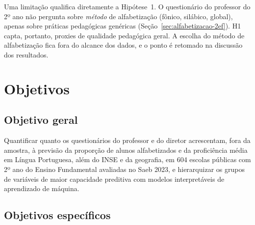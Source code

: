Uma limitação qualifica diretamente a Hipótese~1. O questionário do
professor do 2º ano não pergunta sobre \emph{método} de alfabetização
(fônico, silábico, global), apenas sobre práticas pedagógicas genéricas
(Seção~\ref{sec:alfabetizacao-2ef}). H1 capta, portanto, proxies de
qualidade pedagógica geral. A escolha do método de alfabetização fica fora
do alcance dos dados, e o ponto é retomado na discussão dos
resultados.

\section{Objetivos}
\label{sec:objetivos}

\subsection{Objetivo geral}

Quantificar quanto os questionários do professor e do diretor acrescentam,
fora da amostra, à previsão da proporção de alunos alfabetizados e da
proficiência média em Língua Portuguesa, além do INSE e da geografia, em
604 escolas públicas com 2º ano do Ensino Fundamental avaliadas no Saeb
2023, e hierarquizar os grupos de variáveis de maior capacidade preditiva
com modelos interpretáveis de aprendizado de máquina.

\subsection{Objetivos específicos}
\label{sec:objetivos-especificos}

